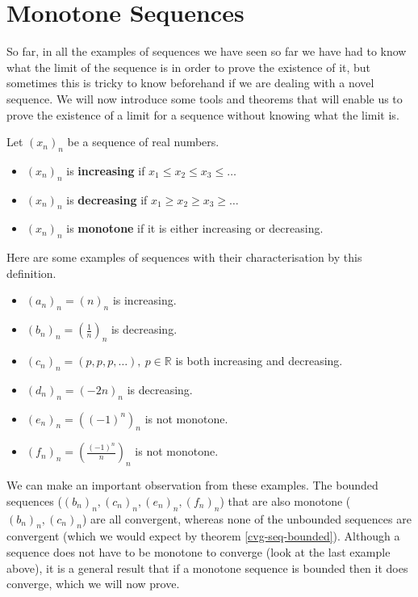 \documentclass[../real_analysis.tex]{subfiles}
\begin{document}
    \section{Monotone Sequences}
        So far, in all the examples of sequences we have seen so far we have had to know what the limit of the sequence is in order to prove the existence of it, but sometimes this is tricky to know beforehand if we are dealing with a novel sequence. We will now introduce some tools and theorems that will enable us to prove the existence of a limit for a sequence without knowing what the limit is.
        \begin{definition}
            Let $(x_n)_n$ be a sequence of real numbers.
            \begin{itemize}
                \item $(x_n)_n$ is \textbf{increasing} if $x_1\leq x_2\leq x_3\leq\dots$
                \item $(x_n)_n$ is \textbf{decreasing} if $x_1\geq x_2\geq x_3\geq\dots$
                \item $(x_n)_n$ is \textbf{monotone} if it is either increasing or decreasing.
            \end{itemize}
        \end{definition}
        \begin{example}
            Here are some examples of sequences with their characterisation by this definition.
            \begin{itemize}
                \item $(a_n)_n=(n)_n$ is increasing.
                \item $(b_n)_n=\left(\frac{1}{n}\right)_n$ is decreasing.
                \item $(c_n)_n=(p, p, p,\dots),\ p\in\mathbb{R}$ is both increasing and decreasing.
                \item $(d_n)_n=(-2n)_n$ is decreasing.
                \item $(e_n)_n=((-1)^n)_n$ is not monotone.
                \item $(f_n)_n=\left(\frac{(-1)^n}{n}\right)_n$ is not monotone.
            \end{itemize}
        \end{example}
        We can make an important observation from these examples. The bounded sequences ($(b_n)_n, (c_n)_n, (e_n)_n, (f_n)_n$) that are also monotone ($(b_n)_n, (c_n)_n$) are all convergent, whereas none of the unbounded sequences are convergent (which we would expect by theorem \ref{cvg-seq-bounded}). Although a sequence does not have to be monotone to converge (look at the last example above), it is a general result that if a monotone sequence is bounded then it does converge, which we will now prove.
\end{document}
